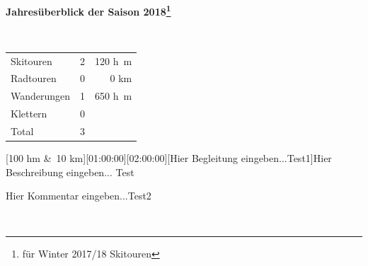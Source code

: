 \begin{center}{\Large \textbf{ Jahres\"uberblick der Saison 2018\footnote{f\"ur Winter 2017/18  Skitouren}}} 

~

\begin{tabular}{lrr}
Skitouren & 2 & 120 \si{h\meter}\\
Radtouren& 0 & 0 \si{\kilo\meter}\\
Wanderungen& 1 & 650 \si{h\meter}\\
Klettern& 0&\\\hline
Total& 3 &
\end{tabular}\end{center}\newpage 
\begin{minipage}{\textwidth}[100 hm \&~10 km][01:00:00][02:00:00][Hier Begleitung eingeben...Test1]\label{2018-06-08-Test}Hier Beschreibung eingeben... Test


 Hier Kommentar eingeben...Test2
\end{minipage}\vspace{2em} ~\newline 
